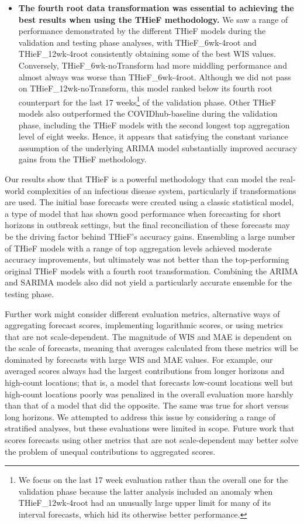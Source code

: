 \documentclass[12pt]{article}
\begin{document}
\begin{itemize}
\item \textbf{The fourth root data transformation was essential to achieving the best results when using the THieF methodology.} \newline We saw a range of performance demonstrated by the different THieF models during the validation and testing phase analyses, with THieF\_6wk-4root and THieF\_12wk-4root consistently obtaining some of the best WIS values. Conversely, THieF\_6wk-noTransform had more middling performance and almost always was worse than THieF\_6wk-4root. Although we did not pass on THieF\_12wk-noTransform, this model ranked below its fourth root counterpart for the last 17 weeks\footnote{We focus on the last 17 week evaluation rather than the overall one for the validation phase because the latter analysis included an anomaly when THieF\_12wk-4root had an unusually large upper limit for many of its interval forecasts, which hid its otherwise better performance.} of the validation phase. Other THieF models also outperformed the COVIDhub-baseline during the validation phase, including the THieF models with the second longest top aggregation level of eight weeks. Hence, it appears that satisfying the constant variance assumption of the underlying ARIMA model substantially improved accuracy gains from the THieF methodology.
\end{itemize}

Our results show that THieF is a powerful methodology that can model the real-world complexities of an infectious disease system, particularly if transformations are used. The initial base forecasts were created using a classic statistical model, a type of model that has shown good performance when forecasting for short horizons in outbreak settings\cite{lauer}, but the final reconciliation of these forecasts may be the driving factor behind THieF's accuracy gains. Ensembling a large number of THieF models with a range of top aggregation levels achieved moderate accuracy improvements, but ultimately was not better than the top-performing original THieF models with a fourth root transformation. Combining the ARIMA and SARIMA models also did not yield a particularly accurate ensemble for the testing phase.

Further work might consider different evaluation metrics, alternative ways of aggregating forecast scores, implementing logarithmic scores, or using metrics that are not scale-dependent. The magnitude of WIS and MAE is dependent on the scale of forecasts, meaning that averages calculated from these metrics will be dominated by forecasts with large WIS and MAE values. For example, our averaged scores always had the largest contributions from longer horizons and high-count locations; that is, a model that forecasts low-count locations well but high-count locations poorly was penalized in the overall evaluation more harshly than that of a model that did the opposite. The same was true for short versus long horizons. We attempted to address this issue by considering a range of stratified analyses, but these evaluations were limited in scope. Future work that scores forecasts using other metrics that are not scale-dependent may better solve the problem of unequal contributions to aggregated scores.
\end{document}

